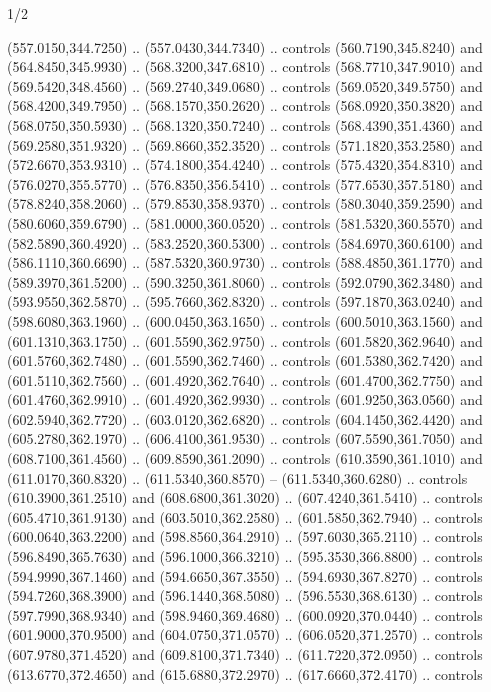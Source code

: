 \begin{flagdescription}{1/2}
\begin{scope}[xshift=0.5\flaglength,yshift=0.5\flagwidth,scale=\flagwidth/759]
\begin{scope}[y=0.8pt, x=0.8pt, yscale=-1,shift={(-720,-480)}]
\begin{scope}[cm={{1.14637,0.0,0.0,1.17117,(33.17849,82.1384)}}]
  (557.0150,344.7250) .. (557.0430,344.7340) .. controls (560.7190,345.8240) and
  (564.8450,345.9930) .. (568.3200,347.6810) .. controls (568.7710,347.9010) and
  (569.5420,348.4560) .. (569.2740,349.0680) .. controls (569.0520,349.5750) and
  (568.4200,349.7950) .. (568.1570,350.2620) .. controls (568.0920,350.3820) and
  (568.0750,350.5930) .. (568.1320,350.7240) .. controls (568.4390,351.4360) and
  (569.2580,351.9320) .. (569.8660,352.3520) .. controls (571.1820,353.2580) and
  (572.6670,353.9310) .. (574.1800,354.4240) .. controls (575.4320,354.8310) and
  (576.0270,355.5770) .. (576.8350,356.5410) .. controls (577.6530,357.5180) and
  (578.8240,358.2060) .. (579.8530,358.9370) .. controls (580.3040,359.2590) and
  (580.6060,359.6790) .. (581.0000,360.0520) .. controls (581.5320,360.5570) and
  (582.5890,360.4920) .. (583.2520,360.5300) .. controls (584.6970,360.6100) and
  (586.1110,360.6690) .. (587.5320,360.9730) .. controls (588.4850,361.1770) and
  (589.3970,361.5200) .. (590.3250,361.8060) .. controls (592.0790,362.3480) and
  (593.9550,362.5870) .. (595.7660,362.8320) .. controls (597.1870,363.0240) and
  (598.6080,363.1960) .. (600.0450,363.1650) .. controls (600.5010,363.1560) and
  (601.1310,363.1750) .. (601.5590,362.9750) .. controls (601.5820,362.9640) and
  (601.5760,362.7480) .. (601.5590,362.7460) .. controls (601.5380,362.7420) and
  (601.5110,362.7560) .. (601.4920,362.7640) .. controls (601.4700,362.7750) and
  (601.4760,362.9910) .. (601.4920,362.9930) .. controls (601.9250,363.0560) and
  (602.5940,362.7720) .. (603.0120,362.6820) .. controls (604.1450,362.4420) and
  (605.2780,362.1970) .. (606.4100,361.9530) .. controls (607.5590,361.7050) and
  (608.7100,361.4560) .. (609.8590,361.2090) .. controls (610.3590,361.1010) and
  (611.0170,360.8320) .. (611.5340,360.8570) -- (611.5340,360.6280) .. controls
  (610.3900,361.2510) and (608.6800,361.3020) .. (607.4240,361.5410) .. controls
  (605.4710,361.9130) and (603.5010,362.2580) .. (601.5850,362.7940) .. controls
  (600.0640,363.2200) and (598.8560,364.2910) .. (597.6030,365.2110) .. controls
  (596.8490,365.7630) and (596.1000,366.3210) .. (595.3530,366.8800) .. controls
  (594.9990,367.1460) and (594.6650,367.3550) .. (594.6930,367.8270) .. controls
  (594.7260,368.3900) and (596.1440,368.5080) .. (596.5530,368.6130) .. controls
  (597.7990,368.9340) and (598.9460,369.4680) .. (600.0920,370.0440) .. controls
  (601.9000,370.9500) and (604.0750,371.0570) .. (606.0520,371.2570) .. controls
  (607.9780,371.4520) and (609.8100,371.7340) .. (611.7220,372.0950) .. controls
  (613.6770,372.4650) and (615.6880,372.2970) .. (617.6660,372.4170) .. controls

\end{scope}
\end{scope}
\end{scope}
\end{flagdescription}
